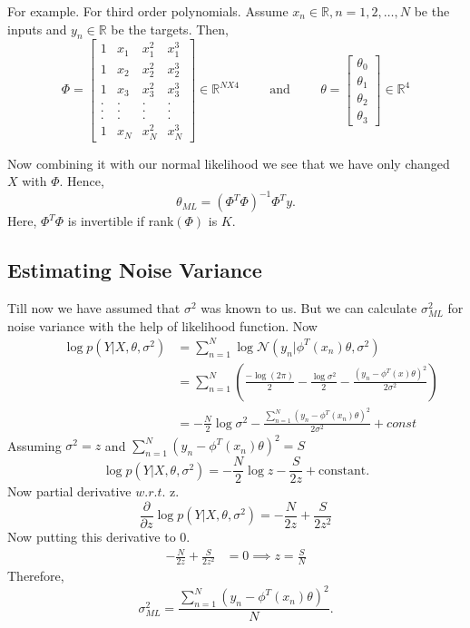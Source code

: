 \documentclass[12pt]{article}
\numberwithin{equation}{section}
\begin{document}
For example. For third order polynomials. Assume $x_{n} \in \mathbb{R}, n=1, 2, \dots, N$ be the inputs and $y_{n} \in \mathbb{R}$ be the targets. Then, 
$$\Phi = \begin{bmatrix}
	1 & x_{1} & x_{1}^2 & x_{1}^3\\
	1 & x_{2} & x_{2}^2 & x_{2}^3\\
	1 & x_{3} & x_{3}^2 & x_{3}^3\\
	. & . & . & .\\
	. & . & . & .\\
	. & . & . & .\\
	1 & x_{N} & x_{N}^2 & x_{N}^3
\end{bmatrix} \in \mathbb{R}^{NX4} \hspace{1cm}
\text{and} \hspace{1cm} \theta = \begin{bmatrix}
	\theta_{0}\\ \theta_{1}\\ \theta_{2}\\ \theta_{3}
\end{bmatrix} \in \mathbb{R}^4$${Now combining it with our normal likelihood we see that we have only changed $X$ with $\Phi$. Hence,
\begin{equation*}
	\theta_{ML} = (\Phi^T\Phi)^{-1}\Phi^Ty.
\end{equation*}
Here, $\Phi^T\Phi$ is invertible if rank$(\Phi)$ is $K$.


\subsection{Estimating Noise Variance}
Till now we have assumed that $\sigma^2$ was known to us. But we can calculate $\sigma_{ML}^2$ for noise variance with the help of likelihood function. Now
\begin{align*}
\hspace{1cm}  \log p(Y|X, \theta, \sigma^2) &= \sum_{n=1}^{N}\log \mathcal{N}(y_{n}| \phi^T(x_{n})\theta, \sigma^2)\\
	&= \sum_{n=1}^{N} (\frac{-\log(2\pi)}{2} - \frac{\log \sigma^2}{2} - \frac{(y_{n}-\phi^T(x)\theta)^2}{2\sigma^2})\\
	&= -\frac{N}{2}\log \sigma^2 - \frac{\sum_{n=1}^{N}(y_{n}-\phi^T(x_{n})\theta)^2}{2\sigma^2} + const
\end{align*}
Assuming $\sigma^2 = z$ and $\sum_{n=1}^{N}(y_{n}-\phi^T(x_{n})\theta)^2 = S$
\begin{equation*}
	\log p(Y|X, \theta, \sigma^2) = -\frac{N}{2}\log z - \frac{S}{2z} + \text{constant}.
\end{equation*}
Now partial derivative $w.r.t.$ z.
\begin{equation*}
	\frac{\partial}{\partial z}\log p(Y|X, \theta, \sigma^2) = -\frac{N}{2z} + \frac{S}{2z^2}
\end{equation*}
Now putting this derivative to 0.
\begin{align*}
	-\frac{N}{2z} + \frac{S}{2z^2} &= 0\implies z = \frac{S}{N}
\end{align*}
Therefore,
\begin{equation*}
 \sigma_{ML}^2 = \frac{\sum_{n=1}^{N}(y_{n}-\phi^T(x_{n})\theta)^2}{N}.
\end{equation*}
}
\end{document}
